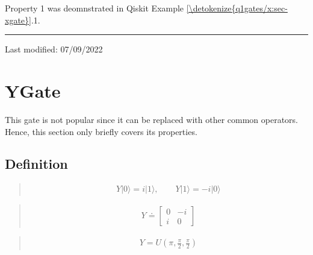 \documentclass[letterpaper,10pt,english]{jupyterBook}
\begin{document}
\sphinxAtStartPar
Property 1 was deomnstrated in Qiskit Example \hyperref[\detokenize{q1gates/x:sec-xgate}]{\ref{\detokenize{q1gates/x:sec-xgate}}}.1.


\bigskip\hrule\bigskip


\sphinxAtStartPar
Last modified: 07/09/2022

\sphinxstepscope


\section{YGate}
\label{\detokenize{q1gates/y:ygate}}\label{\detokenize{q1gates/y:sec-ygate}}\label{\detokenize{q1gates/y::doc}}
\sphinxAtStartPar
This gate is not popular since it can be replaced with other common operators.  Hence, this section only briefly covers its properties.

\sphinxAtStartPar
{}


\subsection{Definition}
\label{\detokenize{q1gates/y:definition}}
\sphinxAtStartPar
{}
\begin{quote}
\begin{equation*}
\begin{split}
Y |0\rangle = i|1\rangle, \qquad Y |1\rangle = -i |0\rangle
\end{split}
\end{equation*}\end{quote}

\sphinxAtStartPar
{}
\begin{quote}
\begin{equation}\label{equation:q1gates/y:YGate-matrix}
\begin{split}
Y \doteq \begin{bmatrix} 0 & -i \\ i & 0 \end{bmatrix}
\end{split}
\end{equation}\end{quote}

\sphinxAtStartPar
{}
\begin{quote}
\begin{equation}\label{equation:q1gates/y:YGate-U}
\begin{split}
Y = U\left(\pi,\frac{\pi}{2},\frac{\pi}{2}\right)
\end{split}
\end{equation}\end{quote}
\end{document}
